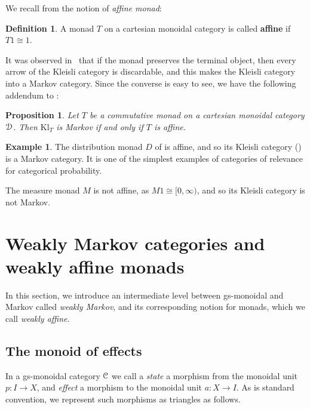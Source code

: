 \documentclass[a4paper,UKenglish,numberwithinsect,cleveref, autoref, thm-restate]{lipics-v2021}
\theoremstyle{plain} %
\newtheorem{myproposition}[mytheorem]{Proposition}
\theoremstyle{definition} %
\newtheorem{mydefinition}[mytheorem]{Definition}
\newtheorem{myexample}[mytheorem]{Example}
\begin{document}
We recall from \cite{Kock71,Jacobs1994} the notion of \emph{affine monad}:

\begin{mydefinition}
 A monad $T$ on a cartesian monoidal category is called \textbf{affine} if $T1\cong 1$.
\end{mydefinition}

It was observed in~\cite[Corollary~3.2]{Fritz_2020} that if the monad preserves the terminal object, then every arrow of the Kleisli category is discardable, and this makes the Kleisli category into a Markov category.
Since the converse is easy to see, we have the following addendum to :

\begin{myproposition}\label{affinemarkov}
Let $T$ be a commutative monad on a cartesian monoidal category $\mathcal{D}$. Then $\mathrm{Kl}_T$ is Markov if and only if $T$ is affine.
\end{myproposition}
 
 
\begin{myexample}
 The distribution monad $D$ of  is affine, and so its Kleisli category () is a Markov category. It is one of the simplest examples of categories of relevance for categorical probability.
 
 The measure monad $M$ is not affine, as $M1\cong[0,\infty)$, and so its Kleisli category is not Markov.
\end{myexample}


\section{Weakly Markov categories and weakly affine monads}
\label{secweakly}

In this section, we introduce an intermediate level between gs-monoidal and Markov called \emph{weakly Markov}, and its corresponding notion for monads, which we call \emph{weakly affine}.

\subsection{The monoid of effects}\label{monoids}

In a gs-monoidal category $\mathcal{C}$ we call a \emph{state} a morphism from the monoidal unit $p:I\to X$, and \emph{effect} a morphism to the monoidal unit $a:X\to I$.
As is standard convention, we represent such morphisms as triangles as follows.
\end{document}
